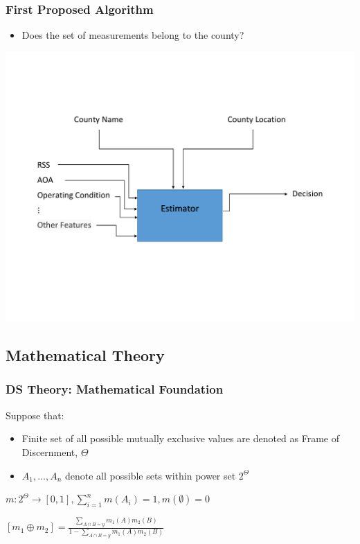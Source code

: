 \documentclass{beamer}
\begin{document}
\begin{frame}
\frametitle{First Proposed Algorithm}
\begin{itemize}
\item{Does the set of measurements belong to the county?}
\end{itemize}
\begin{center}
\includegraphics[width=.8\textwidth]{classifier2}
\end{center}
\end{frame}

\subsection{Mathematical Theory}

\begin{frame}
\frametitle{DS Theory: Mathematical Foundation}
Suppose that:
\begin{itemize}
\item{Finite set of all possible mutually exclusive values are denoted as Frame of Discernment, $\Theta$}
\item{$A_1,\dots,A_n$ denote all possible sets within power set $2^\Theta$}
\end{itemize}
\begin{theorem}
{$m: 2^\Theta \rightarrow [0,1], \sum\limits_{i=1}^n m(A_i) = 1, m(\emptyset) = 0$}
\end{theorem}
\begin{theorem}
{$[m_1 \oplus m_2] = \frac{\sum\nolimits_{A\cap B = y} m_1(A)m_2(B)}{1-\sum\nolimits_{A\cap B = y} m_1(A)m_2(B)}$}
\end{theorem}
\end{frame}
\end{document}
